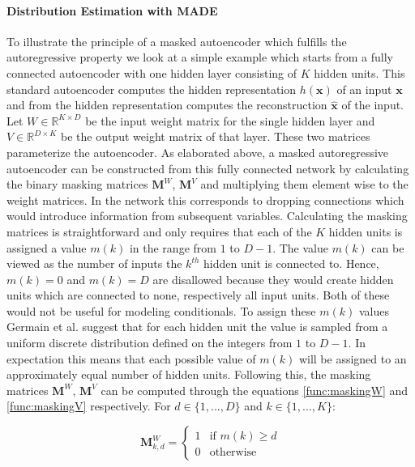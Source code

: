 \documentclass[11pt,titlepage,oneside,openany]{book}
\begin{document}
\paragraph{Distribution Estimation with MADE}
To illustrate the principle of a masked autoencoder which fulfills the autoregressive property we look at a simple example which starts from a fully connected autoencoder with one hidden layer consisting of $K$ hidden units. This standard autoencoder computes the hidden representation $h(\pmb{x})$ of an input $\pmb{x}$ and from the hidden representation computes the reconstruction $\hat{\pmb{x}}$ of the input. Let $W \in \mathbb{R}^{K \times D}$ be the input weight matrix for the single hidden layer and $V \in \mathbb{R}^{D \times K}$ be the output weight matrix of that layer. These two matrices parameterize the autoencoder. As elaborated above, a masked autoregressive autoencoder can be constructed from this fully connected network by calculating the binary masking matrices $\mathbf{M}^W$, $\mathbf{M}^V$ and multiplying them element wise to the weight matrices. In the network this corresponds to dropping connections which would introduce information from subsequent variables. Calculating the masking matrices is straightforward and only requires that each of the $K$ hidden units is assigned a value $m(k)$ in the range from $1$ to $D-1$. The value $m(k)$ can be viewed as the number of inputs the $k^{th}$ hidden unit is connected to. Hence, $m(k)=0$ and $m(k)=D$ are disallowed because they would create hidden units which are connected to none, respectively all input units. Both of these would not be useful for modeling conditionals. To assign these $m(k)$ values Germain et al. \cite{germain_made_nodate} suggest that for each hidden unit the value is sampled from a uniform discrete distribution defined on the integers from $1$ to $D-1$. In expectation this means that each possible value of $m(k)$ will be assigned to an approximately equal number of hidden units. Following this, the masking matrices $\mathbf{M}^W$, $\mathbf{M}^V$ can be computed through the equations \ref{func:maskingW} and \ref{func:maskingV} respectively. For $d \in \{1,...,D\}$ and $k \in \{1,...,K\}$:

\begin{equation}
	\label{func:maskingW}
	\mathbf{M}_{k,d}^W = 
	\begin{cases}
		1 & \text{if $m(k) \geq d$}\\
		0 & \text{otherwise}
	\end{cases}
\end{equation}
\end{document}
